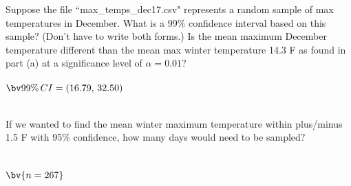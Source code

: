 \documentclass{article}
\begin{document}
\begin{flushleft}
\begin{enumalpha}
\item Suppose the file ``max\_temps\_dec17.csv" represents a random sample of max temperatures in December. What is a 99\% confidence interval based on this sample? (Don't have to write both forms.) Is the mean maximum December temperature different than the mean max winter temperature 14.3 \textdegree F as found in part (a) at a significance level of $\alpha = 0.01$?\\
\medskip
{}\\
\medskip
$\bv{99\% \, CI = (16.79,\, 32.50)}$\\
\medskip
{}\\
\vspace{.5in}

\item If we wanted to find the mean winter maximum temperature within plus/minus 1.5 \textdegree F with 95\% confidence, how many days would need to be sampled?\\
\medskip
{}\\
\\
\medskip
$\bv{n=267}$\\

\end{enumalpha}



\end{flushleft}
\end{document}
